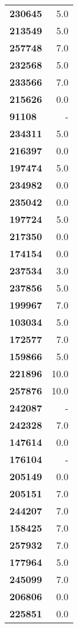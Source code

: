 \documentclass[11pt]{article}
\begin{document}
\begin{center}
\begin{longtable}{lr}
\bottomrule
\endlastfoot
\textbf{230645} &                      5.0 \\
\textbf{213549} &                      5.0 \\
\textbf{257748} &                      7.0 \\
\textbf{232568} &                      5.0 \\
\textbf{233566} &                      7.0 \\
\textbf{215626} &                      0.0 \\
\textbf{91108 } &                        - \\
\textbf{234311} &                      5.0 \\
\textbf{216397} &                      0.0 \\
\textbf{197474} &                      5.0 \\
\textbf{234982} &                      0.0 \\
\textbf{235042} &                      0.0 \\
\textbf{197724} &                      5.0 \\
\textbf{217350} &                      0.0 \\
\textbf{174154} &                      0.0 \\
\textbf{237534} &                      3.0 \\
\textbf{237856} &                      5.0 \\
\textbf{199967} &                      7.0 \\
\textbf{103034} &                      5.0 \\
\textbf{172577} &                      7.0 \\
\textbf{159866} &                      5.0 \\
\textbf{221896} &                     10.0 \\
\textbf{257876} &                     10.0 \\
\textbf{242087} &                        - \\
\textbf{242328} &                      7.0 \\
\textbf{147614} &                      0.0 \\
\textbf{176104} &                        - \\
\textbf{205149} &                      0.0 \\
\textbf{205151} &                      7.0 \\
\textbf{244207} &                      7.0 \\
\textbf{158425} &                      7.0 \\
\textbf{257932} &                      7.0 \\
\textbf{177964} &                      5.0 \\
\textbf{245099} &                      7.0 \\
\textbf{206806} &                      0.0 \\
\textbf{225851} &                      0.0 \\
\end{longtable}
\end{center}
\end{document}
